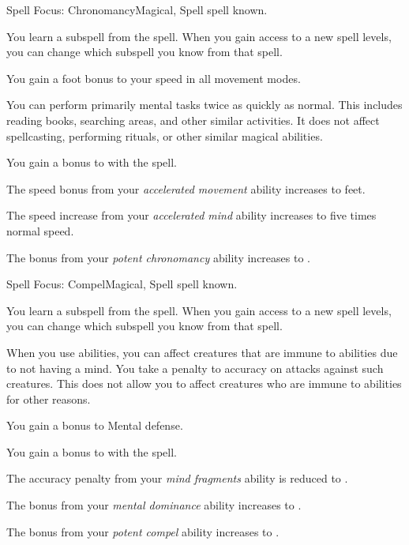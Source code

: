     \begin{feat}{Spell Focus: Chronomancy}{Magical, Spell}
        \featpre {} spell known.

         You learn a subspell from the  spell.
        When you gain access to a new spell levels, you can change which subspell you know from that spell.

         You gain a  foot bonus to your speed in all movement modes.

         You can perform primarily mental tasks twice as quickly as normal.
        This includes reading books, searching areas, and other similar activities.
        It does not affect spellcasting, performing rituals, or other similar magical abilities.

         You gain a  bonus to  with the  spell. 

         The speed bonus from your \textit{accelerated movement} ability increases to  feet.

         The speed increase from your \textit{accelerated mind} ability increases to five times normal speed.

         The bonus from your \textit{potent chronomancy} ability increases to .
    \end{feat}

    \begin{feat}{Spell Focus: Compel}{Magical, Spell}
        \featpre {} spell known.

         You learn a subspell from the  spell.
        When you gain access to a new spell levels, you can change which subspell you know from that spell.

         When you use  abilities, you can affect creatures that are immune to  abilities due to not having a mind.
        You take a  penalty to accuracy on attacks against such creatures.
        This does not allow you to affect creatures who are immune to  abilities for other reasons.

         You gain a  bonus to Mental defense.

         You gain a  bonus to  with the  spell. 

         The accuracy penalty from your \textit{mind fragments} ability is reduced to .

         The bonus from your \textit{mental dominance} ability increases to .

         The bonus from your \textit{potent compel} ability increases to .
    \end{feat}

